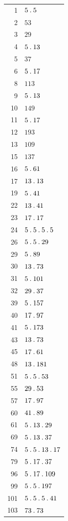 \begingroup\small\setlength{\tabcolsep}{5pt}
\begin{longtable}{@{}r|l@{}}
1 & $5\mathbin{.} 5$\\
2 & $53$\\
3 & $29$\\
4 & $5\mathbin{.} 13$\\
5 & $37$\\
6 & $5\mathbin{.} 17$\\
8 & $113$\\
9 & $5\mathbin{.} 13$\\
10 & $149$\\
11 & $5\mathbin{.} 17$\\
12 & $193$\\
13 & $109$\\
15 & $137$\\
16 & $5\mathbin{.} 61$\\
17 & $13\mathbin{.} 13$\\
19 & $5\mathbin{.} 41$\\
22 & $13\mathbin{.} 41$\\
23 & $17\mathbin{.} 17$\\
24 & $5\mathbin{.} 5\mathbin{.} 5\mathbin{.} 5$\\
26 & $5\mathbin{.} 5\mathbin{.} 29$\\
29 & $5\mathbin{.} 89$\\
30 & $13\mathbin{.} 73$\\
31 & $5\mathbin{.} 101$\\
32 & $29\mathbin{.} 37$\\
39 & $5\mathbin{.} 157$\\
40 & $17\mathbin{.} 97$\\
41 & $5\mathbin{.} 173$\\
43 & $13\mathbin{.} 73$\\
45 & $17\mathbin{.} 61$\\
48 & $13\mathbin{.} 181$\\
51 & $5\mathbin{.} 5\mathbin{.} 53$\\
55 & $29\mathbin{.} 53$\\
57 & $17\mathbin{.} 97$\\
60 & $41\mathbin{.} 89$\\
61 & $5\mathbin{.} 13\mathbin{.} 29$\\
69 & $5\mathbin{.} 13\mathbin{.} 37$\\
74 & $5\mathbin{.} 5\mathbin{.} 13\mathbin{.} 17$\\
79 & $5\mathbin{.} 17\mathbin{.} 37$\\
96 & $5\mathbin{.} 17\mathbin{.} 109$\\
99 & $5\mathbin{.} 5\mathbin{.} 197$\\
101 & $5\mathbin{.} 5\mathbin{.} 5\mathbin{.} 41$\\
103 & $73\mathbin{.} 73$\\

\end{longtable}
